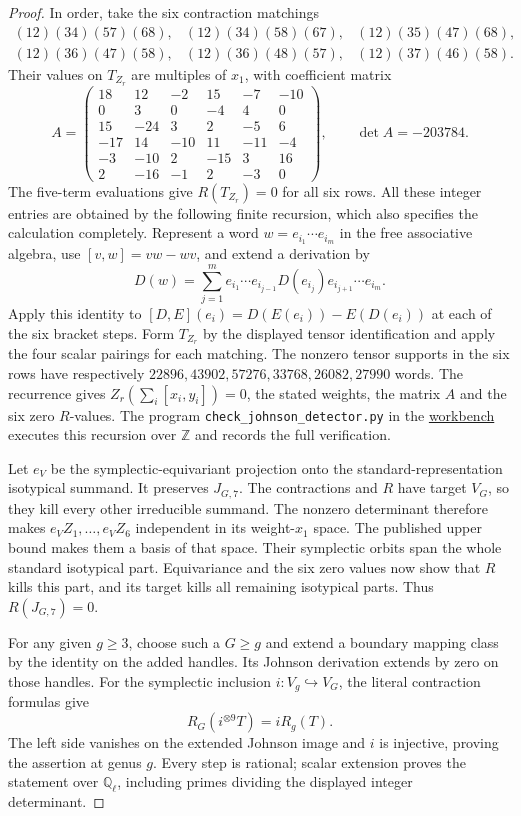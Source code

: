 \documentclass[11pt]{article}
\theoremstyle{definition}\newtheorem{definition}[theorem]{Definition}
\newcommand{\workbenchurl}{https://github.com/KokunoYumeto/k-theory-and-galois-groups-workbench}
\begin{document}
\begin{proof}
In order, take the six contraction matchings
\[
\begin{array}{lll}
(12)(34)(57)(68),&(12)(34)(58)(67),&(12)(35)(47)(68),\\
(12)(36)(47)(58),&(12)(36)(48)(57),&(12)(37)(46)(58).
\end{array}
\]
Their values on $T_{Z_r}$ are multiples of $x_1$, with coefficient
matrix
\[
 A=\begin{pmatrix}
18&12&-2&15&-7&-10\\
0&3&0&-4&4&0\\
15&-24&3&2&-5&6\\
-17&14&-10&11&-11&-4\\
-3&-10&2&-15&3&16\\
2&-16&-1&2&-3&0
\end{pmatrix},\qquad \det A=-203784.
\]
The five-term evaluations give $R(T_{Z_r})=0$ for all six rows.
All these integer entries are obtained by the following finite
recursion, which also specifies the calculation completely.
Represent a word $w=e_{i_1}\cdots e_{i_m}$ in the free associative
algebra, use $[v,w]=vw-wv$, and extend a derivation by
\[
 D(w)=\sum_{j=1}^m e_{i_1}\cdots e_{i_{j-1}}
                    D(e_{i_j})e_{i_{j+1}}\cdots e_{i_m}.
\]
Apply this identity to $[D,E](e_i)=D(E(e_i))-E(D(e_i))$ at each
of the six bracket steps. Form $T_{Z_r}$ by the displayed tensor
identification and apply the four scalar pairings for each matching.
The nonzero tensor supports in the six rows have respectively
$22896,43902,57276,33768,26082,27990$ words. The recurrence gives
$Z_r(\sum_i[x_i,y_i])=0$, the stated weights, the matrix $A$ and
the six zero $R$-values. The program \texttt{check\_johnson\_detector.py}
in the \href{\workbenchurl}{workbench} executes this recursion over
$\mathbb Z$ and records the full verification.

Let $e_V$ be the symplectic-equivariant projection onto the
standard-representation isotypical summand. It preserves $J_{G,7}$.
The contractions and $R$ have target $V_G$, so they kill every other
irreducible summand. The nonzero determinant therefore makes
$e_VZ_1,\ldots,e_VZ_6$ independent in its weight-$x_1$ space.
The published upper bound makes them a basis of that space.
Their symplectic orbits span the whole standard isotypical part.
Equivariance and the six zero values now show that $R$ kills this
part, and its target kills all remaining isotypical parts.
Thus $R(J_{G,7})=0$.

For any given $g\geq3$, choose such a $G\geq g$ and extend a
boundary mapping class by the identity on the added handles.
Its Johnson derivation extends by zero on those handles.
For the symplectic inclusion $i:V_g\hookrightarrow V_G$, the
literal contraction formulas give
\[
 R_G(i^{\otimes9}T)=iR_g(T).
\]
The left side vanishes on the extended Johnson image and $i$ is
injective, proving the assertion at genus $g$. Every step is rational;
scalar extension proves the statement over $\mathbb Q_\ell$, including
primes dividing the displayed integer determinant.
\end{proof}
\end{document}
